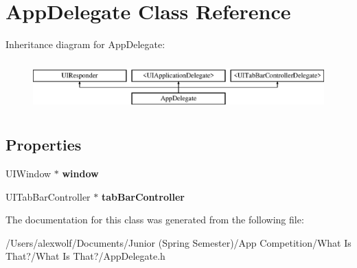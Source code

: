 \hypertarget{interface_app_delegate}{\section{App\-Delegate Class Reference}
\label{interface_app_delegate}
}
Inheritance diagram for App\-Delegate\-:\begin{figure}[H]
\begin{center}
\leavevmode
\includegraphics[height=1.944445cm]{interface_app_delegate}
\end{center}
\end{figure}
\subsection*{Properties}
\begin{DoxyCompactItemize}
\item 
\hypertarget{interface_app_delegate_acf48ac24125e688cac1a85445cd7fac2}{U\-I\-Window $\ast$ {\bfseries window}}\label{interface_app_delegate_acf48ac24125e688cac1a85445cd7fac2}

\item 
\hypertarget{interface_app_delegate_a97f54a4a7a7ea9200720661abab5dffe}{U\-I\-Tab\-Bar\-Controller $\ast$ {\bfseries tab\-Bar\-Controller}}\label{interface_app_delegate_a97f54a4a7a7ea9200720661abab5dffe}

\end{DoxyCompactItemize}


The documentation for this class was generated from the following file\-:\begin{DoxyCompactItemize}
\item 
/\-Users/alexwolf/\-Documents/\-Junior (\-Spring Semester)/\-App Competition/\-What Is That?/\-What Is That?/App\-Delegate.\-h\end{DoxyCompactItemize}
